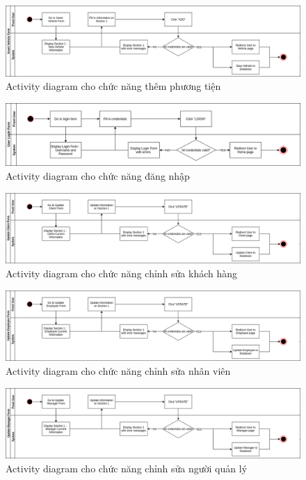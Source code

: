 \documentclass[a4paper]{article}
\begin{document}
\begin{figure}[!h]
    \includegraphics[width=14.7cm]{ActivityDiagram/AddVehicle}
    \centering
    \caption{Activity diagram cho chức năng thêm phương tiện}
    \label{fig:activity_add_vehicle}
\end{figure}
\begin{figure}[!h]
    \includegraphics[width=14.7cm]{ActivityDiagram/Login}
    \centering
    \caption{Activity diagram cho chức năng đăng nhập}
    \label{fig:activity_login}
\end{figure}
\begin{figure}[!h]
    \includegraphics[width=14.7cm]{ActivityDiagram/EditCustomer}
    \centering
    \caption{Activity diagram cho chức năng chỉnh sửa khách hàng}
    \label{fig:activity_edit_customer}
\end{figure}
\begin{figure}[!h]
    \includegraphics[width=14.7cm]{ActivityDiagram/EditEmployee}
    \centering
    \caption{Activity diagram cho chức năng chỉnh sửa nhân viên}
    \label{fig:activity_edit_employee}
\end{figure}
\begin{figure}[!h]
    \includegraphics[width=14.7cm]{ActivityDiagram/EditManager}
    \centering
    \caption{Activity diagram cho chức năng chỉnh sửa người quản lý}
    \label{fig:activity_edit_manager}
\end{figure}
\end{document}

